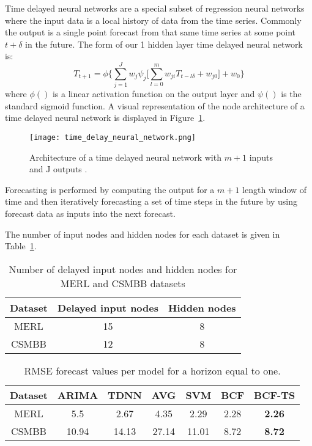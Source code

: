 Time delayed neural networks are a special subset of regression neural networks where the input data is a local history of data from the time series.  Commonly the output is a single point forecast from that same time series at some point $t + \delta$ in the future.   The form of our 1 hidden layer time delayed neural network is:
\begin{equation}
T_{t + 1} = \phi \{ \sum_{j = 1}^{J} w_{j}\psi_{j} \bigg[ \sum_{l = 0}^{m}w_{ji}T_{t - l\delta} + w_{j0} \bigg] + w_0 \}
\end{equation}
\noindent where $\phi()$ is a linear activation function on the output layer and $\psi()$ is the standard sigmoid function.  A visual representation of the node architecture of a time delayed neural network is displayed in Figure~\ref{fig:tdnnarch}.

\begin{figure}[h]
	\centering
		\texttt{[image: time\_delay\_neural\_network.png]}
		\caption{Architecture of a time delayed neural network with $m + 1$ inputs and J outputs \cite{Hansen2003}.}
	\label{fig:tdnnarch}
\end{figure}

Forecasting is performed by computing the output for a $m + 1$ length window of time and then iteratively forecasting a set of time steps in the future by using forecast data as inputs into the next forecast. 

The number of input nodes and hidden nodes for each dataset is given in Table~\ref{fig:tdnntab}.

\begin{table}[h]
\centering
\caption{Number of delayed input nodes and hidden nodes for MERL and CSMBB datasets}
\begin{tabular}{|c|c|c|} \hline
Dataset & Delayed input nodes & Hidden nodes\\ \hline
MERL & 15 & 8\\ \hline
CSMBB & 12 & 8\\ \hline
\end{tabular}
\label{fig:tdnntab}
\end{table}


\begin{table}[t!]
\centering
\caption{RMSE forecast values per model for a horizon equal to one.}
\begin{tabular}{|c|c|c|c|c|c|c|} \hline
Dataset & ARIMA & TDNN & AVG & SVM & BCF & BCF-TS\\ \hline
MERL & 5.5 & 2.67 & 4.35 & 2.29 & 2.28 & \textbf{2.26}\\ \hline
CSMBB & 10.94 & 14.13 & 27.14 & 11.01 & 8.72 & \textbf{8.72}\\ \hline
\end{tabular}
\label{fig:rmsetab}
\end{table}

